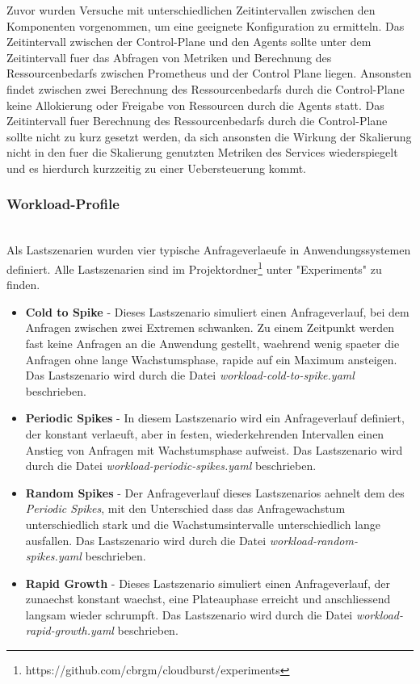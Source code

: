 \documentclass[runningheads]{llncs}
\begin{document}
Zuvor wurden Versuche mit unterschiedlichen Zeitintervallen zwischen den Komponenten vorgenommen, um eine geeignete Konfiguration zu ermitteln. Das Zeitintervall zwischen der Control-Plane und den Agents sollte unter dem Zeitintervall fuer das Abfragen von Metriken und Berechnung des Ressourcenbedarfs zwischen Prometheus und der Control Plane liegen. Ansonsten findet zwischen zwei Berechnung des Ressourcenbedarfs durch die Control-Plane keine Allokierung oder Freigabe von Ressourcen durch die Agents statt. Das Zeitintervall fuer Berechnung des Ressourcenbedarfs durch die Control-Plane sollte nicht zu kurz gesetzt werden, da sich ansonsten die Wirkung der Skalierung nicht in den fuer die Skalierung genutzten Metriken des Services wiederspiegelt und es hierdurch kurzzeitig zu einer Uebersteuerung kommt. \\

\subsubsection{Workload-Profile} \hfill\\

Als Lastszenarien wurden vier typische Anfrageverlaeufe in Anwendungssystemen definiert. Alle Lastszenarien sind im Projektordner\footnote{https://github.com/cbrgm/cloudburst/experiments} unter "Experiments" zu finden.

 \begin{itemize}
 	\item \textbf{Cold to Spike} - Dieses Lastszenario simuliert einen Anfrageverlauf, bei dem Anfragen zwischen zwei Extremen schwanken. Zu einem Zeitpunkt werden fast keine Anfragen an die Anwendung gestellt, waehrend wenig spaeter die Anfragen ohne lange Wachstumsphase, rapide auf ein Maximum ansteigen. Das Lastszenario wird durch die Datei \textit{workload-cold-to-spike.yaml} beschrieben.
 	
 	\item \textbf{Periodic Spikes} - In diesem Lastszenario wird ein Anfrageverlauf definiert, der konstant verlaeuft, aber in festen, wiederkehrenden Intervallen einen Anstieg von Anfragen mit Wachstumsphase aufweist.  Das Lastszenario wird durch die Datei \textit{workload-periodic-spikes.yaml} beschrieben.
 	
 	\item \textbf{Random Spikes} - Der Anfrageverlauf dieses Lastszenarios aehnelt dem des \textit{Periodic Spikes}, mit den Unterschied dass das Anfragewachstum unterschiedlich stark und die Wachstumsintervalle unterschiedlich lange ausfallen.  Das Lastszenario wird durch die Datei \textit{workload-random-spikes.yaml} beschrieben.
 	
 	\item \textbf{Rapid Growth} -  Dieses Lastszenario simuliert einen Anfrageverlauf, der zunaechst konstant waechst, eine Plateauphase erreicht und anschliessend langsam wieder schrumpft. Das Lastszenario wird durch die Datei \textit{workload-rapid-growth.yaml} beschrieben.
 \end{itemize}
\end{document}
